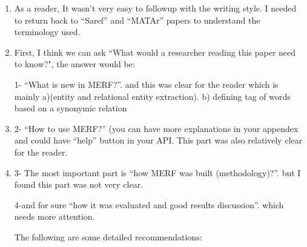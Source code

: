 \begin{enumerate}[leftmargin=0mm,label=\bfseries CommentR3.\arabic*]
\item \label{Review.3.1}
As a reader, It wasn't very easy to followup with the writing 
style. 
I needed to return back to ``Saref'' and ``MATAr'' papers 
to understand the terminology used.



\item \label{Review.3.2}
First, I think we can ask 
``What would a researcher reading this paper need to know?", the answer would be:

1- ``What is new in MERF?''. and this was clear for the reader 
    which is mainly
    a)(entity and relational entity extraction).
    b) defining tag of words based on a synonymic relation


\item \label{Review.3.3}
2- ``How to use MERF?''
(you can have more explanations in your appendex and could have 
``help'' button in your API. This part was also relatively 
clear for the reader.



\item \label{Review.3.4}
3- The most important part is ``how MERF was built 
(methodology)?''. but I found this part was not very clear.


4-and for sure ``how it was evaluated and good results discussion''. 
which needs more attention.


The following are some detailed recommendations:


\end{enumerate}
